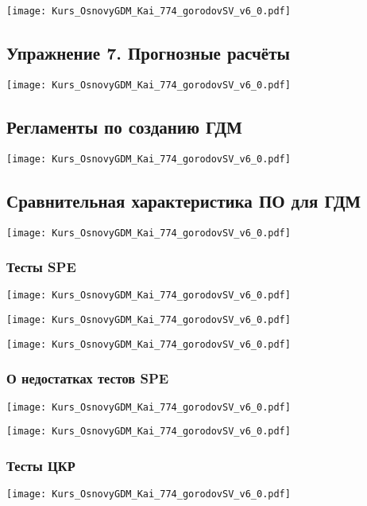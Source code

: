 \documentclass[main.tex]{subfiles}
\begin{document}
\texttt{[image: Kurs\_OsnovyGDM\_Kai\_774\_gorodovSV\_v6\_0.pdf]}

\subsection{Упражнение 7. Прогнозные расчёты}

\texttt{[image: Kurs\_OsnovyGDM\_Kai\_774\_gorodovSV\_v6\_0.pdf]}

\subsection{Регламенты по созданию ГДМ}

\texttt{[image: Kurs\_OsnovyGDM\_Kai\_774\_gorodovSV\_v6\_0.pdf]}

\subsection{Сравнительная характеристика ПО для ГДМ}

\texttt{[image: Kurs\_OsnovyGDM\_Kai\_774\_gorodovSV\_v6\_0.pdf]}

\subsubsection{Тесты SPE}

\texttt{[image: Kurs\_OsnovyGDM\_Kai\_774\_gorodovSV\_v6\_0.pdf]}

\texttt{[image: Kurs\_OsnovyGDM\_Kai\_774\_gorodovSV\_v6\_0.pdf]}

\texttt{[image: Kurs\_OsnovyGDM\_Kai\_774\_gorodovSV\_v6\_0.pdf]}

\subsubsection{О недостатках тестов SPE}

\texttt{[image: Kurs\_OsnovyGDM\_Kai\_774\_gorodovSV\_v6\_0.pdf]}

\texttt{[image: Kurs\_OsnovyGDM\_Kai\_774\_gorodovSV\_v6\_0.pdf]}

\subsubsection{Тесты ЦКР}

\texttt{[image: Kurs\_OsnovyGDM\_Kai\_774\_gorodovSV\_v6\_0.pdf]}
\end{document}
